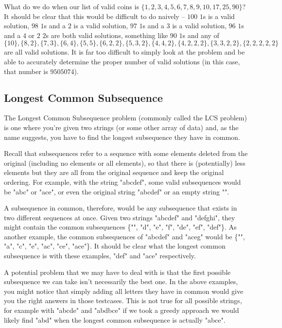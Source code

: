 What do we do when our list of valid coins is $\{1,2,3,4,5,6,7,8,9,10,17,25,90\}$? It should be clear that this would be difficult to do naively -- $100$ $1$s is a valid solution, $98$ $1$s and a $2$ is a valid solution, $97$ $1$s and a $3$ is a valid solution, $96$ $1$s and a $4$ or $2$ $2$s are both valid solutions, something like $90$ $1$s and any of $\{10\},\allowbreak\{8,2\},\allowbreak\{7,3\},\allowbreak\{6,4\},\allowbreak\{5,5\},\allowbreak\{6,2,2\},\allowbreak\{5,3,2\},\allowbreak\{4,4,2\},\allowbreak\{4,2,2,2\},\allowbreak\{3,3,2,2\},\allowbreak\{2,2,2,2,2\}$ are all valid solutions. It is far too difficult to simply look at the problem and be able to accurately determine the proper number of valid solutions (in this case, that number is $9505074$).


\subsection{Longest Common Subsequence}

The Longest Common Subsequence problem (commonly called the LCS problem) is one where you're given two strings (or some other array of data) and, as the name suggests, you have to find the longest subsequence they have in common.

Recall that subsequences refer to a sequence with some elements deleted from the original (including no elements or all elements), so that there is (potentially) less elements but they are all from the original sequence and keep the original ordering. For example, with the string "abcdef", some valid subsequences would be "abc" or "ace", or even the original string "abcdef" or an empty string "".

A subsequence in common, therefore, would be any subsequence that exists in two different sequences at once. Given two strings "abcdef" and "defghi", they might contain the common subsequences \{"", "d", "e", "f", "de", "ef", "def"\}. As another example, the common subsequences of "abcdef" and "aceg" would be \{"", "a", "c", "e", "ac", "ce", "ace"\}. It should be clear what the longest common subsequence is with these examples, "def" and "ace" respectively.

A potential problem that we may have to deal with is that the first possible subsequence we can take isn't necessarily the best one. In the above examples, you might notice that simply adding all letters they have in common would give you the right answers in those testcases. This is not true for all possible strings, for example with "abcde" and "abdbce" if we took a greedy approach we would likely find "abd" when the longest common subsequence is actually "abce".

